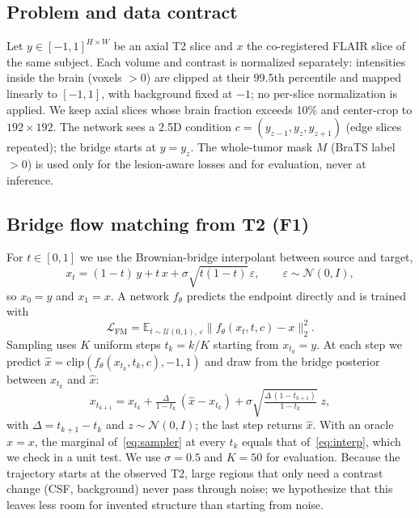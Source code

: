 \documentclass[journal]{IEEEtran}
\begin{document}
\subsection{Problem and data contract}
Let $y\in[-1,1]^{H\times W}$ be an axial T2 slice and $x$ the co-registered FLAIR slice of the same subject. Each volume
and contrast is normalized separately: intensities inside the brain (voxels $>0$) are clipped at their 99.5th percentile
and mapped linearly to $[-1,1]$, with background fixed at $-1$; no per-slice normalization is applied. We keep axial
slices whose brain fraction exceeds 10\% and center-crop to $192\times192$. The network sees a 2.5D condition
$c=(y_{z-1},y_z,y_{z+1})$ (edge slices repeated); the bridge starts at $y=y_z$. The whole-tumor mask $M$ (BraTS label
$>0$) is used only for the lesion-aware losses and for evaluation, never at inference.

\subsection{Bridge flow matching from T2 (F1)}
For $t\in[0,1]$ we use the Brownian-bridge interpolant between source and target,
\begin{equation}
x_t = (1-t)\,y + t\,x + \sigma\sqrt{t(1-t)}\,\varepsilon,\qquad \varepsilon\sim\mathcal N(0,I),
\label{eq:interp}
\end{equation}
so $x_0=y$ and $x_1=x$. A network $f_\theta$ predicts the endpoint directly and is trained with
\begin{equation}
\mathcal L_{\mathrm{FM}} = \mathbb E_{t\sim\mathcal U(0,1),\,\varepsilon}\big\|f_\theta(x_t,t,c)-x\big\|_2^2 .
\label{eq:loss}
\end{equation}
Sampling uses $K$ uniform steps $t_k=k/K$ starting from $x_{t_0}=y$. At each step we predict $\hat x=\mathrm{clip}(f_\theta(x_{t_k},t_k,c),-1,1)$
and draw from the bridge posterior between $x_{t_k}$ and $\hat x$:
\begin{equation}
x_{t_{k+1}} = x_{t_k} + \tfrac{\Delta}{1-t_k}\,(\hat x - x_{t_k}) + \sigma\sqrt{\tfrac{\Delta\,(1-t_{k+1})}{1-t_k}}\;z,
\label{eq:sampler}
\end{equation}
with $\Delta=t_{k+1}-t_k$ and $z\sim\mathcal N(0,I)$; the last step returns $\hat x$. With an oracle $\hat x=x$, the
marginal of~\eqref{eq:sampler} at every $t_k$ equals that of~\eqref{eq:interp}, which we check in a unit test. We use
$\sigma=0.5$ and $K=50$ for evaluation. Because the trajectory starts at the observed T2, large regions that only need a
contrast change (CSF, background) never pass through noise; we hypothesize that this leaves less room for invented structure than starting from noise.
\end{document}
